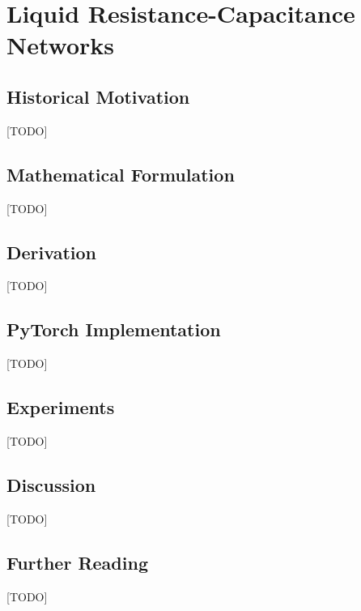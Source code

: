 
\chapter{Liquid Resistance-Capacitance Networks}
\label{ch:16_lrc}


\section{Historical Motivation}
[TODO]

\section{Mathematical Formulation}
[TODO]

\section{Derivation}
[TODO]

\section{PyTorch Implementation}
[TODO]

\section{Experiments}
[TODO]

\section{Discussion}
[TODO]

\section{Further Reading}
[TODO]
